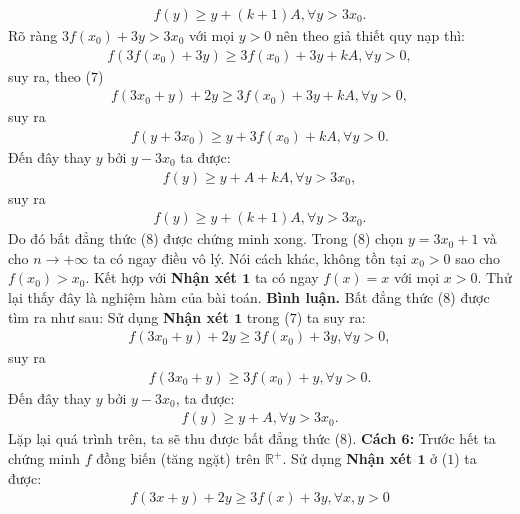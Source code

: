 \begin{multicols}{2}
	\begin{align*}
		f(y) \ge y + (k + 1)A,\forall y > 3{x_0}.
	\end{align*}
	Rõ ràng $3f({x_0}) + 3y > 3{x_0}$  với mọi $y > 0$ nên theo giả thiết quy nạp thì:
	\begin{align*}
		f(3f({x_0}) \!+\! 3y) \!\ge\! 3f({x_0}) \!+\! 3y \!+\! kA,\forall\! y \!>\! 0,
	\end{align*}
	suy ra, theo ($7$)
	\begin{align*}
		f(3{x_0} \!+\! y) \!+\! 2y \!\ge\! 3f({x_0}) \!+\! 3y \!+\! kA,\forall \!y \!>\! 0,
	\end{align*}
	suy ra
	\begin{align*}
			f(y + 3{x_0}) \ge y + 3f({x_0}) + kA,\forall y > 0.
	\end{align*}
	Đến đây thay  $y$ bởi $y - 3x_0$  ta được:
	\begin{align*}
		f(y) \ge y + A + kA,\forall y > 3{x_0},
	\end{align*}
	suy ra
	\begin{align*}
		f(y) \ge y + (k + 1)A,\forall y > 3{x_0}.
	\end{align*}
	Do đó bất đẳng thức ($8$) được chứng minh xong. Trong ($8$) chọn $y = 3x_0 + 1$  và cho  $n \to + \infty$ ta có ngay điều vô lý.
	\vskip 0.1cm
	Nói cách khác, không tồn tại $x_0 > 0$ sao cho $f(x_0) > x_0$.  Kết hợp với \textbf{\color{hoccungpi}Nhận xét $\pmb1$} ta có ngay $f(x) = x$  với mọi $x > 0$. Thử lại thấy đây là nghiệm hàm của bài toán.
	\vskip 0.1cm
	\textbf{\color{hoccungpi}Bình luận.} Bất đẳng thức ($8$) được tìm ra như sau: Sử dụng \textbf{\color{hoccungpi}Nhận xét $\pmb1$} trong ($7$) ta suy ra: 
	\begin{align*}
		f(3{x_0} + y) + 2y \ge 3f({x_0}) + 3y,\forall y > 0,
	\end{align*}
	suy ra
	\begin{align*}
		f(3{x_0} + y) \ge 3f({x_0}) + y,\forall y > 0.
	\end{align*}
	Đến đây thay $y$ bởi $y - 3x_0$, ta được: 
	\begin{align*}
		f(y) \ge y + A,\forall y > 3{x_0}.
	\end{align*}
	Lặp lại quá trình trên, ta sẽ thu được bất đẳng thức ($8$).
	\vskip 0.1cm
	\textbf{\color{hoccungpi}Cách $\pmb6$:}
	\vskip 0.1cm     
	Trước hết ta chứng minh  $f$ đồng biến (tăng ngặt) trên $\mathbb{R^+}$.
	\vskip 0.1cm 
	Sử dụng \textbf{\color{hoccungpi}Nhận xét $\pmb1$} ở ($1$) ta được:
	\begin{align*}
		f(3x + y) + 2y \ge 3f(x) + 3y,\forall x,y > 0

\end{align*}
\end{multicols}

